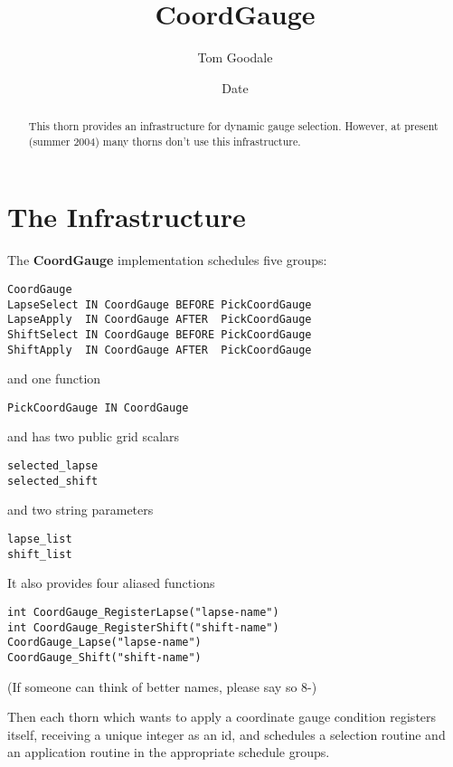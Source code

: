 \documentclass{article}
\begin{document}
\title{CoordGauge}
\author{Tom Goodale}
\date{$ $Date$ $}

\maketitle



\begin{abstract}
This thorn provides an infrastructure for dynamic gauge selection.
However, at present (summer 2004) many thorns don't use this infrastructure.
\end{abstract}


\section{The Infrastructure}

The {\bf CoordGauge} implementation schedules five groups:

\begin{verbatim}
CoordGauge
LapseSelect IN CoordGauge BEFORE PickCoordGauge
LapseApply  IN CoordGauge AFTER  PickCoordGauge
ShiftSelect IN CoordGauge BEFORE PickCoordGauge
ShiftApply  IN CoordGauge AFTER  PickCoordGauge
\end{verbatim}
%
and one function
\begin{verbatim}
PickCoordGauge IN CoordGauge
\end{verbatim}
%
and has two public grid scalars
\begin{verbatim}
selected_lapse
selected_shift
\end{verbatim}
%
and two string parameters
\begin{verbatim}
lapse_list
shift_list
\end{verbatim}

It also provides four aliased functions
%
\begin{verbatim}
int CoordGauge_RegisterLapse("lapse-name")
int CoordGauge_RegisterShift("shift-name")
CoordGauge_Lapse("lapse-name")
CoordGauge_Shift("shift-name")
\end{verbatim}

(If someone can think of better names, please say so 8-)

Then each thorn which wants to apply a coordinate gauge condition
registers itself, receiving a unique integer as an id, and schedules a
selection routine and an application routine in the appropriate schedule
groups.
\end{document}

